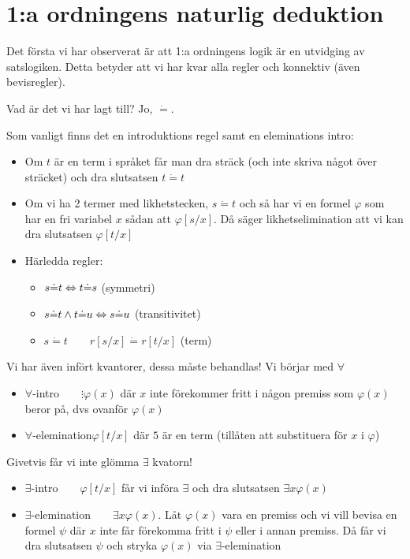 \section{1:a ordningens naturlig deduktion}
\par\bigskip
\noindent Det första vi har observerat är att 1:a ordningens logik är en utvidging av satslogiken. Detta betyder att vi har kvar alla regler och konnektiv (även bevisregler).
\par\bigskip
\noindent Vad är det vi har lagt till? Jo, $\dot{=}$.\par
\noindent Som vanligt finns det en introduktions regel samt en eleminations intro:
\par\bigskip
\begin{itemize}
  \item Om $t$ är en term i språket får man dra sträck (och inte skriva något över sträcket) och dra slutsatsen $t\dot{=}t$ 
  \item Om vi ha 2 termer med likhetstecken, $s\dot{=}t$ och så har vi en formel $\varphi$ som har en fri variabel $x$ sådan att $\varphi[s/x]$. Då säger likhetselimination att vi kan dra slutsatsen $\varphi[t/x]$
  \item Härledda regler:
    \begin{itemize}
      \item $s\dot{=}t\Leftrightarrow t\dot{=}s$ (symmetri)
      \item $s\dot{=}t\wedge t\dot{=}u\Leftrightarrow s\dot{=}u$ (transitivitet)
      \item $s\dot{=}t\qquad r[s/x]\dot{=}r[t/x]$ (term)
    \end{itemize}
\end{itemize}
\par\bigskip
\noindent Vi har även infört kvantorer, dessa måste behandlas! Vi börjar med $\forall$
\par\bigskip
\begin{itemize}
  \item $\forall$-intro$\qquad\vdots\varphi(x)$ där $x$ inte förekommer fritt i någon premiss som $\varphi(x)$ beror på, dvs ovanför $\varphi(x)$
  \item $\forall$-elemination$\varphi[t/x]$ där $5$ är en term (tillåten att substituera för $x$ i $\varphi$)
\end{itemize}
\par\bigskip
\noindent Givetvis får vi inte glömma $\exists$ kvatorn!
\par\bigskip
\begin{itemize}
  \item $\exists$-intro$\qquad\varphi[t/x]$ får vi införa $\exists$ och dra slutsatsen $\exists x\varphi(x)$ 
  \item $\exists$-elemination$\qquad\exists x\varphi(x)$. Låt $\varphi(x)$ vara en premiss och vi vill bevisa en formel $\psi$ där $x$ inte får förekomma fritt i $\psi$ eller i annan premiss. Då får vi dra slutsatsen $\psi$ och stryka $\varphi(x)$ via $\exists$-elemination
\end{itemize}

